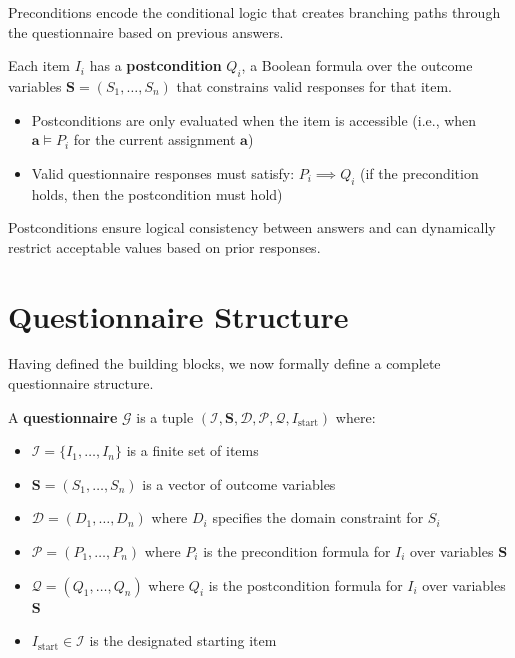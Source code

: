 Preconditions encode the conditional logic that creates branching paths through the questionnaire based on previous answers.

\begin{definition}[Postcondition]
\label{def:postcondition}
Each item $I_i$ has a \textbf{postcondition} $Q_i$, a Boolean formula over the outcome variables $\mathbf{S} = (S_1, \dots, S_n)$ that constrains valid responses for that item.
\begin{itemize}
    \item Postconditions are only evaluated when the item is accessible (i.e., when $\mathbf{a} \models P_i$ for the current assignment $\mathbf{a}$)
    \item Valid questionnaire responses must satisfy: $P_i \implies Q_i$ (if the precondition holds, then the postcondition must hold)
\end{itemize}
\end{definition}

Postconditions ensure logical consistency between answers and can dynamically restrict acceptable values based on prior responses.

\section{Questionnaire Structure}

Having defined the building blocks, we now formally define a complete questionnaire structure.

\begin{definition}[Questionnaire]
\label{def:questionnaire}
A \textbf{questionnaire} $\mathcal{G}$ is a tuple $(\mathcal{I}, \mathbf{S}, \mathcal{D}, \mathcal{P}, \mathcal{Q}, I_{\mathrm{start}})$ where:
\begin{itemize}
    \item $\mathcal{I} = \{I_1, \dots, I_n\}$ is a finite set of items
    \item $\mathbf{S} = (S_1, \dots, S_n)$ is a vector of outcome variables
    \item $\mathcal{D} = (D_1, \dots, D_n)$ where $D_i$ specifies the domain constraint for $S_i$
    \item $\mathcal{P} = (P_1, \dots, P_n)$ where $P_i$ is the precondition formula for $I_i$ over variables $\mathbf{S}$
    \item $\mathcal{Q} = (Q_1, \dots, Q_n)$ where $Q_i$ is the postcondition formula for $I_i$ over variables $\mathbf{S}$
    \item $I_{\mathrm{start}} \in \mathcal{I}$ is the designated starting item
\end{itemize}
\end{definition}

